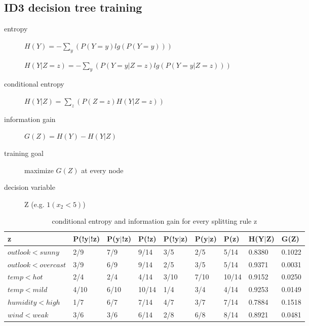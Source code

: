 \documentclass[12pt]{article}
\begin{document}
\begin{multicols}{2}
  \section{ID3 decision tree training}
  \begin{description}
    \item[entropy] $H(Y) = - \sum_{y} (P(Y = y) lg(P(Y = y)))$
    \item[] $H(Y|Z=z) = - \sum_{y} (P(Y = y|Z=z) lg(P(Y = y|Z=z)))$
    \item[conditional entropy] $H(Y|Z) = \sum_{z} (P(Z = z) H(Y | Z = z))$
    \item[information gain] $G(Z) = H(Y) - H(Y|Z)$
    \item[training goal] maximize $G(Z)$ at every node
    \item[decision variable] Z (e.g. $1(x_2 < 5)$)
  \end{description}
\end{multicols}{}
  \begin{table}[htb]
    \centering
    \begin{tabularx}{\textwidth}{|l|l|l|l|l|l|l|l|X|} \hline
      z & P(!y$|$!z) & P(y$|$!z) & P(!z) & P(!y$|$z) & P(y$|$z) & P(z) & H(Y$|$Z) & G(Z) \\ \hline
      $outlook<sunny$ & 2/9 & 7/9 & 9/14 & 3/5 & 2/5 & 5/14 & 0.8380 & 0.1022 \\ \hline
      $outlook<overcast$ & 3/9 & 6/9 & 9/14 & 2/5 & 3/5 & 5/14 & 0.9371 & 0.0031 \\ \hline
      $temp<hot$ & 2/4 & 2/4 & 4/14 & 3/10 & 7/10 & 10/14 & 0.9152 & 0.0250 \\ \hline
      $temp<mild$ & 4/10 & 6/10 & 10/14 & 1/4 & 3/4 & 4/14 & 0.9253 & 0.0149 \\ \hline
      $humidity<high$ & 1/7 & 6/7 & 7/14 & 4/7 & 3/7 & 7/14 & 0.7884 & 0.1518 \\ \hline
      $wind<weak$ & 3/6 & 3/6 & 6/14 & 2/8 & 6/8 & 8/14 & 0.8921 & 0.0481 \\ \hline
    \end{tabularx}
    \caption{conditional entropy and information gain for every splitting rule z}
    \label{tab:entropy}
  \end{table}
\end{document}
